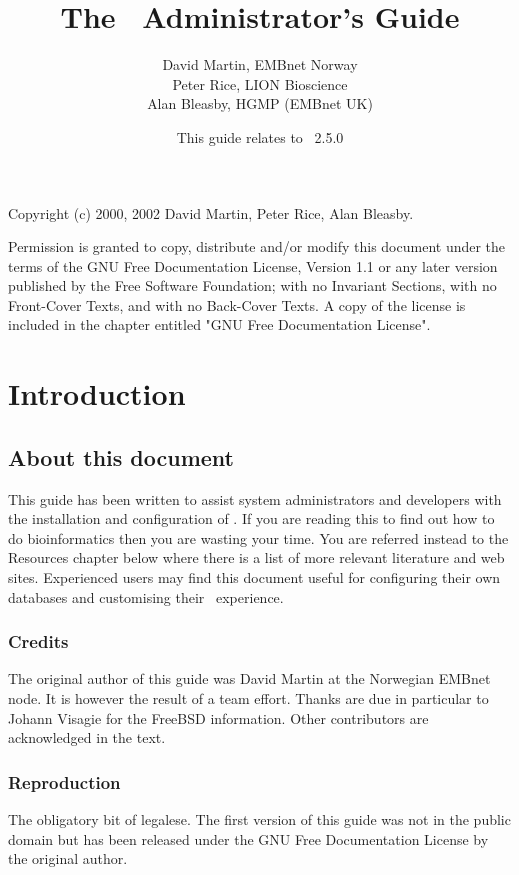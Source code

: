 \documentclass{report}
\begin{document}
\title{The \EMBOSS\ Administrator's Guide}
\author{David Martin, EMBnet Norway \\
Peter Rice, LION Bioscience \\
Alan Bleasby, HGMP (EMBnet UK)}
\date{This guide relates to \EMBOSS\ 2.5.0}

\maketitle

Copyright (c) 2000, 2002 David Martin, Peter Rice, Alan Bleasby.

Permission is granted to copy, distribute and/or modify this document
under the terms of the GNU Free Documentation
License, Version 1.1 or any
later version published by the Free Software Foundation; with no
Invariant Sections, with no Front-Cover Texts, and with no Back-Cover
Texts.  A copy of the license is included in the chapter entitled "GNU
Free Documentation License".

\tableofcontents

\chapter{Introduction}
\section{About this document}
This guide has been written to assist system administrators and
developers with the installation and configuration of \EMBOSS. If you
are reading this to find out how to do bioinformatics then you are
wasting your time. You are referred instead to the Resources chapter
below where there is a list of more relevant literature and web sites.
Experienced users may find this document useful for configuring their
own databases and customising their \EMBOSS\ experience.


\subsection{Credits}
The original author of this guide was David
Martin at the Norwegian EMBnet
node. It is however the result of a team
effort. Thanks are due in particular to Johann Visagie for the FreeBSD
information. Other contributors are acknowledged in the text.

\subsection{Reproduction}
The obligatory bit of legalese. The first version of this guide was
not in the public domain but has been released under the GNU Free
Documentation License by the original author.
\end{document}
